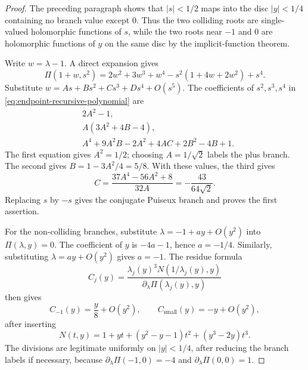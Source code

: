 \begin{proof}
The preceding paragraph shows that \(|s|<1/2\) maps into the disc \(|y|<1/4\) containing no branch value except \(0\).
Thus the two colliding roots are single-valued holomorphic functions of \(s\), while the two roots near \(-1\) and \(0\) are holomorphic functions of \(y\) on the same disc by the implicit-function theorem.

Write \(w=\lambda-1\).  A direct expansion gives
\begin{equation}\label{eq:endpoint-recursive-polynomial}
\Pi(1+w,s^2)=2w^2+3w^3+w^4-s^2(1+4w+2w^2)+s^4.
\end{equation}
Substitute \(w=As+Bs^2+Cs^3+Ds^4+O(s^5)\).  The coefficients of \(s^2,s^3,s^4\) in \eqref{eq:endpoint-recursive-polynomial} are
\begin{align*}
&2A^2-1,\\
&A(3A^2+4B-4),\\
&A^4+9A^2B-2A^2+4AC+2B^2-4B+1.
\end{align*}
The first equation gives \(A^2=1/2\); choosing \(A=1/\sqrt2\) labels the plus branch.
The second gives \(B=1-3A^2/4=5/8\).
With these values, the third gives
\[
C=\frac{37A^4-56A^2+8}{32A}=-\frac{43}{64\sqrt2}.
\]
Replacing \(s\) by \(-s\) gives the conjugate Puiseux branch and proves the first assertion.

For the non-colliding branches, substitute \(
\lambda=-1+ay+O(y^2)
\) into \(\Pi(\lambda,y)=0\).  The coefficient of \(y\) is \(-4a-1\), hence \(a=-1/4\).
Similarly, substituting \(\lambda=ay+O(y^2)\) gives \(a=-1\).
The residue formula
\[
C_j(y)=\frac{\lambda_j(y)^3N(1/\lambda_j(y),y)}{\partial_\lambda\Pi(\lambda_j(y),y)}
\]
then gives
\[
C_{-1}(y)=\frac{y}{8}+O(y^2),
\qquad
C_{\mathrm{small}}(y)=-y+O(y^2),
\]
after inserting
\[
N(t,y)=1+yt+(y^2-y-1)t^2+(y^3-2y)t^3.
\]
The divisions are legitimate uniformly on \(|y|<1/4\), after reducing the branch labels if necessary, because \(\partial_\lambda\Pi(-1,0)=-4\) and \(\partial_\lambda\Pi(0,0)=1\).


\end{proof}
